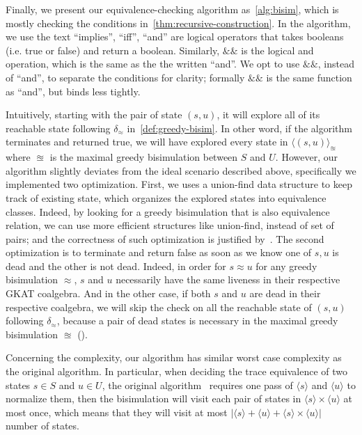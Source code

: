 \documentclass[conference]{IEEEtran}
\begin{document}
Finally, we present our equivalence-checking algorithm as~\cref{alg:bisim}, which is mostly checking the conditions in~\cref{thm:recursive-construction}.  
In the algorithm, we use the text ``implies'', ``iff'', ``and'' are logical operators that takes booleans (i.e. true or false) and return a boolean.
Similarly, \(\&\!\&\) is the logical and operation, which is the same as the the written ``and''. 
We opt to use \(\&\!\&\), instead of ``and'', to separate the conditions for clarity; formally \(\&\!\&\) is the same function as ``and'', but binds less tightly.

Intuitively, starting with the pair of state \((s, u)\), it will explore all of its reachable state following \(δ_≈\) in~\cref{def:greedy-bisim}.
In other word, if the algorithm terminates and returned true, we will have explored every state in \(⟨(s, u)⟩_{≊}\) where \(≊\) is the maximal greedy bisimulation between \(S\) and \(U\).
However, our algorithm slightly deviates from the ideal scenario described above, specifically we implemented two optimization.
First, we uses a union-find data structure to keep track of existing state, which organizes the explored states into equivalence classes.
Indeed, by looking for a greedy bisimulation that is also equivalence relation, we can use more efficient structures like union-find, instead of set of pairs; and the correctness of such optimization is justified by~.
The second optimization is to terminate and return false as soon as we know one of \(s, u\) is dead and the other is not dead.
Indeed, in order for \(s ≈ u\) for any greedy bisimulation \(≈\), \(s\) and \(u\) necessarily have the same liveness in their respective GKAT coalgebra.
And in the other case, if both \(s\) and \(u\) are dead in their respective coalgebra, we will skip the check on all the reachable state of \((s, u)\) following \(δ_≈\), because a pair of dead states is necessary in the maximal greedy bisimulation \(≊\) ().

Concerning the complexity, our algorithm has similar worst case complexity as the original algorithm.
In particular, when deciding the trace equivalence of two states \(s ∈ S\) and \(u ∈ U\), the original algorithm~\cite{smolka_GuardedKleeneAlgebra_2020} requires one pass of \(⟨s⟩\) and \(⟨u⟩\) to normalize them, then the bisimulation will visit each pair of states in \(⟨s⟩ × ⟨u⟩\) at most once, which means that they will visit at most \(|⟨s⟩ + ⟨u⟩ + ⟨s⟩ × ⟨u⟩|\) number of states.
\end{document}
